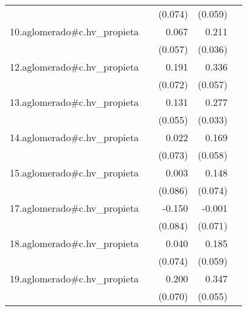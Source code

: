 {\begin{longtable}{l*{4}{D{.}{.}{-1}}}
            &                     &     (0.074)         &     (0.059)         &                     \\
\addlinespace
10.aglomerado#c.hv\_propieta&                     &       0.067         &       0.211\sym{***}&                     \\
            &                     &     (0.057)         &     (0.036)         &                     \\
\addlinespace
12.aglomerado#c.hv\_propieta&                     &       0.191\sym{**} &       0.336\sym{***}&                     \\
            &                     &     (0.072)         &     (0.057)         &                     \\
\addlinespace
13.aglomerado#c.hv\_propieta&                     &       0.131\sym{*}  &       0.277\sym{***}&                     \\
            &                     &     (0.055)         &     (0.033)         &                     \\
\addlinespace
14.aglomerado#c.hv\_propieta&                     &       0.022         &       0.169\sym{**} &                     \\
            &                     &     (0.073)         &     (0.058)         &                     \\
\addlinespace
15.aglomerado#c.hv\_propieta&                     &       0.003         &       0.148\sym{*}  &                     \\
            &                     &     (0.086)         &     (0.074)         &                     \\
\addlinespace
17.aglomerado#c.hv\_propieta&                     &      -0.150         &      -0.001         &                     \\
            &                     &     (0.084)         &     (0.071)         &                     \\
\addlinespace
18.aglomerado#c.hv\_propieta&                     &       0.040         &       0.185\sym{**} &                     \\
            &                     &     (0.074)         &     (0.059)         &                     \\
\addlinespace
19.aglomerado#c.hv\_propieta&                     &       0.200\sym{**} &       0.347\sym{***}&                     \\
            &                     &     (0.070)         &     (0.055)         &                     \\

\end{longtable}}
